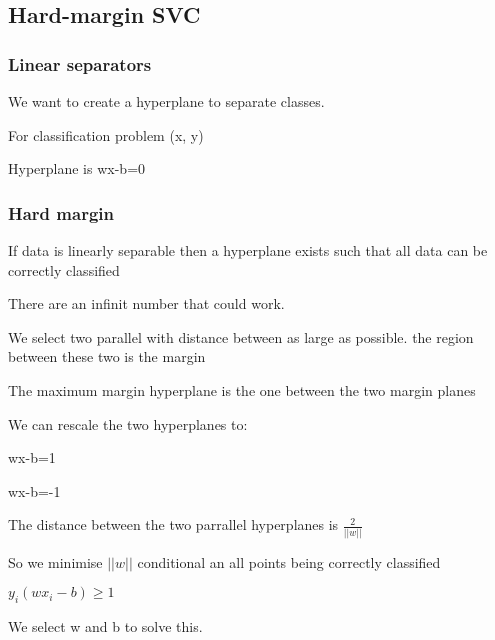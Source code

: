 
\subsection{Hard-margin SVC}

\subsubsection{Linear separators}

We want to create a hyperplane to separate classes.

For classification problem (x, y)

Hyperplane is wx-b=0

\subsubsection{Hard margin}

If data is linearly separable then a hyperplane exists such that all data can be correctly classified

There are an infinit number that could work.

We select two parallel with distance between as large as possible. the region between these two is the margin

The maximum margin hyperplane is the one between the two margin planes

We can rescale the two hyperplanes to:

wx-b=1

wx-b=-1

The distance between the two parrallel hyperplanes is \(\frac{2}{||w||}\)

So we minimise \(||w||\) conditional an all points being correctly classified

\(y_i(wx_i-b)\ge 1\)

We select w and b to solve this.



